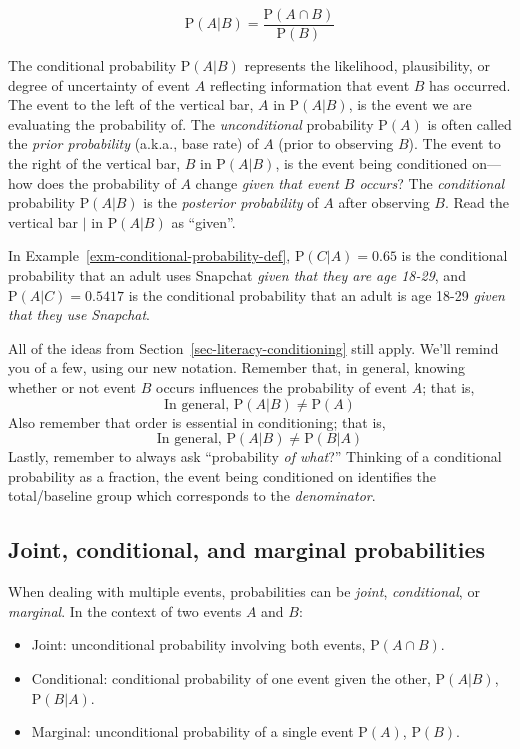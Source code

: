 \documentclass[
  letterpaper,
  DIV=11,
  numbers=noendperiod]{scrreprt}
\providecommand{\tightlist}{%
  \setlength{\itemsep}{0pt}\setlength{\parskip}{0pt}}
\theoremstyle{plain}
\theoremstyle{definition}
\theoremstyle{definition}
\theoremstyle{definition}
\theoremstyle{remark}
\begin{document}
\[
\textrm{P}(A|B) = \frac{\textrm{P}(A\cap B)}{\textrm{P}(B)}
\]

The conditional probability \(\textrm{P}(A|B)\) represents the
likelihood, plausibility, or degree of uncertainty of event \(A\)
reflecting information that event \(B\) has occurred. The event to the
left of the vertical bar, \(A\) in \(\textrm{P}(A|B)\), is the event we
are evaluating the probability of. The \emph{unconditional} probability
\(\textrm{P}(A)\) is often called the \emph{prior probability} (a.k.a.,
base rate) of \(A\) (prior to observing \(B\)). The event to the right
of the vertical bar, \(B\) in \(\textrm{P}(A|B)\), is the event being
conditioned on---how does the probability of \(A\) change \emph{given
that event \(B\) occurs}? The \emph{conditional} probability
\(\textrm{P}(A|B)\) is the \emph{posterior probability} of \(A\) after
observing \(B\). Read the vertical bar \(|\) in \(\textrm{P}(A | B)\) as
``given''.

In Example~\ref{exm-conditional-probability-def},
\(\textrm{P}(C|A) = 0.65\) is the conditional probability that an adult
uses Snapchat \emph{given that they are age 18-29}, and
\(\textrm{P}(A|C) = 0.5417\) is the conditional probability that an
adult is age 18-29 \emph{given that they use Snapchat}.

All of the ideas from Section~\ref{sec-literacy-conditioning} still
apply. We'll remind you of a few, using our new notation. Remember that,
in general, knowing whether or not event \(B\) occurs influences the
probability of event \(A\); that is, \[
\text{In general, } \textrm{P}(A|B) \neq \textrm{P}(A)
\] Also remember that order is essential in conditioning; that is, \[
\text{In general, } \textrm{P}(A|B) \neq \textrm{P}(B|A)
\] Lastly, remember to always ask ``probability \emph{of what}?''
Thinking of a conditional probability as a fraction, the event being
conditioned on identifies the total/baseline group which corresponds to
the \emph{denominator}.

\subsection{Joint, conditional, and marginal
probabilities}\label{joint-conditional-and-marginal-probabilities}

When dealing with multiple events, probabilities can be \emph{joint},
\emph{conditional}, or \emph{marginal}. In the context of two events
\(A\) and \(B\):

\begin{itemize}
\tightlist
\item
  Joint: unconditional probability involving both events,
  \(\textrm{P}(A \cap B)\).
\item
  Conditional: conditional probability of one event given the other,
  \(\textrm{P}(A | B)\), \(\textrm{P}(B | A)\).
\item
  Marginal: unconditional probability of a single event
  \(\textrm{P}(A)\), \(\textrm{P}(B)\).
\end{itemize}
\end{document}
